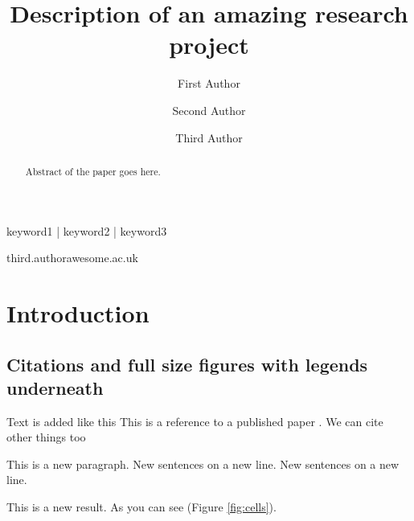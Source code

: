 
\title{Description of an amazing research project}

\author[1,2]{First Author}
\author[1,3]{Second Author}
\author[1,4,\Letter]{Third Author}
\date{}

\maketitle

\begin{abstract}
Abstract of the paper goes here.
\lipsum[1]
\end{abstract}

\begin{keywords}
keyword1 | keyword2 | keyword3
\end{keywords}

\begin{corrauthor}
third.author\at awesome.ac.uk
\end{corrauthor}

\section*{Introduction}\label{s:introduction}


\subsection*{Citations and full size figures with legends underneath}

Text is added like this
This is a reference to a published paper \citep{watson_molecular_1953}.
We can cite other things too \citep{tipton_complexities_2019,zheng_genome_2011,alberts_molecular_2002}

This is a new paragraph.
New sentences on a new line.
New sentences on a new line.

This is a new result.
As you can see (Figure \ref{fig:cells}).

